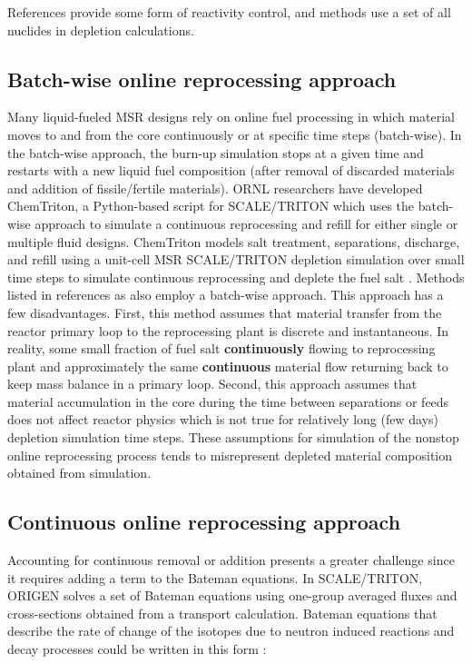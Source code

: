 References \cite{de_troullioud_de_lanversin_toward_2017,doligez_coupled_2014,heuer_towards_2014, sheu_depletion_2013, aufiero_extended_2013} provide some form of reactivity control, 
and methods \cite{doligez_coupled_2014,heuer_towards_2014,aufiero_extended_2013,ahmad_neutronics_2015, 
park_whole_2015,jeong_equilibrium_2016,rykhlevskii_modeling_2019,nuttin_potential_2005} use a set of all nuclides in depletion calculations. 

\subsection{Batch-wise online reprocessing approach}
Many liquid-fueled \gls{MSR} designs rely on online fuel processing in which  
material moves to and from the core continuously or at specific time steps 
(batch-wise). In the batch-wise approach, the burn-up simulation stops at a given 
time and restarts with a new liquid fuel composition (after removal of discarded 
materials and addition of fissile/fertile materials). \gls{ORNL} researchers 
have developed ChemTriton, a Python-based script for SCALE/TRITON which uses the 
batch-wise approach to simulate a continuous reprocessing and refill for either single 
or multiple fluid designs. ChemTriton models salt 
treatment, separations, discharge, and refill using a unit-cell \gls{MSR} 
SCALE/TRITON depletion simulation over small time steps to simulate continuous 
reprocessing and deplete the fuel salt \cite{powers_new_2013}. Methods listed in 
references \cite{zhou_fuel_2018-1,sheu_depletion_2013,park_whole_2015,jeong_equilibrium_2016, powers_inventory_2014,betzler_molten_2017,rykhlevskii_modeling_2019} 
as also employ a batch-wise approach. This approach has a few disadvantages. First, 
this method assumes that material transfer from the reactor primary loop to the reprocessing 
plant is discrete and instantaneous. In reality, some small fraction of fuel salt \textbf{continuously} flowing to reprocessing plant and approximately the same 
\textbf{continuous} material flow returning back to keep mass balance in a 
primary loop. Second, this approach assumes that material accumulation in the core 
during the time between separations or feeds does not affect reactor physics which 
is not true for relatively long (few days) depletion simulation time steps. These assumptions for simulation of the nonstop online reprocessing process tends to
 misrepresent depleted material composition obtained from simulation.

\subsection{Continuous online reprocessing approach}
Accounting for continuous removal or addition presents a greater challenge since it 
requires adding a term to the Bateman equations. In SCALE/TRITON, ORIGEN \cite{gauld_isotopic_2011} solves a set of Bateman equations using one-group averaged fluxes and cross-sections obtained from a transport calculation. Bateman equations that describe the rate of change of the isotopes due to neutron induced reactions and decay
processes could be written in this form \cite{aufiero_extended_2013}:


